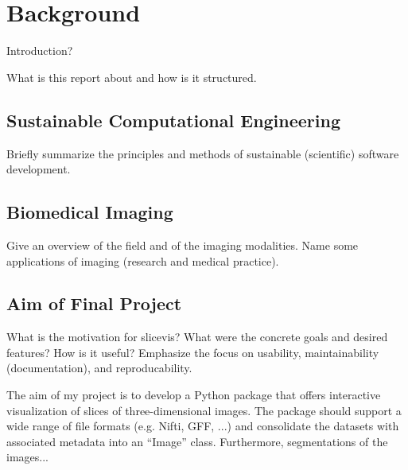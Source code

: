 \chapter{Background}

Introduction?

What is this report about and how is it structured.

\section{Sustainable Computational Engineering}

Briefly summarize the principles and methods of sustainable (scientific) software development.

\section{Biomedical Imaging}

Give an overview of the field and of the imaging modalities. Name some applications of imaging (research and medical practice).

\section{Aim of Final Project}

What is the motivation for slicevis?
What were the concrete goals and desired features?
How is it useful?
Emphasize the focus on usability, maintainability (documentation), and reproducability.

The aim of my project is to develop a Python package that offers interactive visualization of slices of three-dimensional images. The package should support a wide range of file formats (e.g. Nifti, GFF, ...) and consolidate the datasets with associated metadata into an \enquote{Image} class. Furthermore, segmentations of the images...